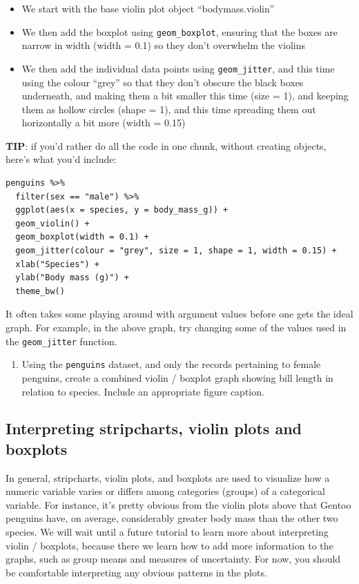 \documentclass[
]{book}
\providecommand{\tightlist}{%
  \setlength{\itemsep}{0pt}\setlength{\parskip}{0pt}}
\begin{document}
\begin{itemize}
\tightlist
\item
  We start with the base violin plot object ``bodymass.violin''
\item
  We then add the boxplot using \texttt{geom\_boxplot}, ensuring that the boxes are narrow in width (width = 0.1) so they don't overwhelm the violins
\item
  We then add the individual data points using \texttt{geom\_jitter}, and this time using the colour ``grey'' so that they don't obscure the black boxes underneath, and making them a bit smaller this time (size = 1), and keeping them as hollow circles (shape = 1), and this time spreading them out horizontally a bit more (width = 0.15)
\end{itemize}

\textbf{TIP}: if you'd rather do all the code in one chunk, without creating objects, here's what you'd include:

\begin{verbatim}
penguins %>% 
  filter(sex == "male") %>%
  ggplot(aes(x = species, y = body_mass_g)) +
  geom_violin() +
  geom_boxplot(width = 0.1) + 
  geom_jitter(colour = "grey", size = 1, shape = 1, width = 0.15) +
  xlab("Species") +
  ylab("Body mass (g)") +
  theme_bw()
\end{verbatim}

It often takes some playing around with argument values before one gets the ideal graph. For example, in the above graph, try changing some of the values used in the \texttt{geom\_jitter} function.

\begin{enumerate}
\def\labelenumi{\arabic{enumi}.}
\tightlist
\item
  Using the \texttt{penguins} dataset, and only the records pertaining to female penguins, create a combined violin / boxplot graph showing bill length in relation to species. Include an appropriate figure caption.
\end{enumerate}

\subsection{Interpreting stripcharts, violin plots and boxplots}\label{interp_violin}

In general, stripcharts, violin plots, and boxplots are used to visualize how a numeric variable varies or differs among categories (groups) of a categorical variable. For instance, it's pretty obvious from the violin plots above that Gentoo penguins have, on average, considerably greater body mass than the other two species. We will wait until a future tutorial to learn more about interpreting violin / boxplots, because there we learn how to add more information to the graphs, such as group means and measures of uncertainty. For now, you should be comfortable interpreting any obvious patterns in the plots.
\end{document}
